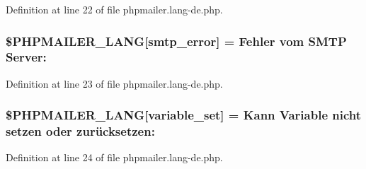 Definition at line 22 of file phpmailer.\+lang-\/de.\+php.

\subsubsection[{\texorpdfstring{\$\+P\+H\+P\+M\+A\+I\+L\+E\+R\+\_\+\+L\+A\+NG}{$PHPMAILER_LANG}}]{\setlength{\rightskip}{0pt plus 5cm}\$P\+H\+P\+M\+A\+I\+L\+E\+R\+\_\+\+L\+A\+NG\mbox{[}\textquotesingle{}smtp\+\_\+error\textquotesingle{}\mbox{]} = \textquotesingle{}Fehler vom {\bf S\+M\+TP} Server\+: \textquotesingle{}}\hypertarget{phpmailer_8lang-de_8php_a7d9cffba1e669c845f8a4c891ee50064}{}\label{phpmailer_8lang-de_8php_a7d9cffba1e669c845f8a4c891ee50064}


Definition at line 23 of file phpmailer.\+lang-\/de.\+php.

\subsubsection[{\texorpdfstring{\$\+P\+H\+P\+M\+A\+I\+L\+E\+R\+\_\+\+L\+A\+NG}{$PHPMAILER_LANG}}]{\setlength{\rightskip}{0pt plus 5cm}\$P\+H\+P\+M\+A\+I\+L\+E\+R\+\_\+\+L\+A\+NG\mbox{[}\textquotesingle{}variable\+\_\+set\textquotesingle{}\mbox{]} = \textquotesingle{}Kann Variable nicht setzen oder zurücksetzen\+: \textquotesingle{}}\hypertarget{phpmailer_8lang-de_8php_af795debc7a739d038742691c358d9032}{}\label{phpmailer_8lang-de_8php_af795debc7a739d038742691c358d9032}


Definition at line 24 of file phpmailer.\+lang-\/de.\+php.

